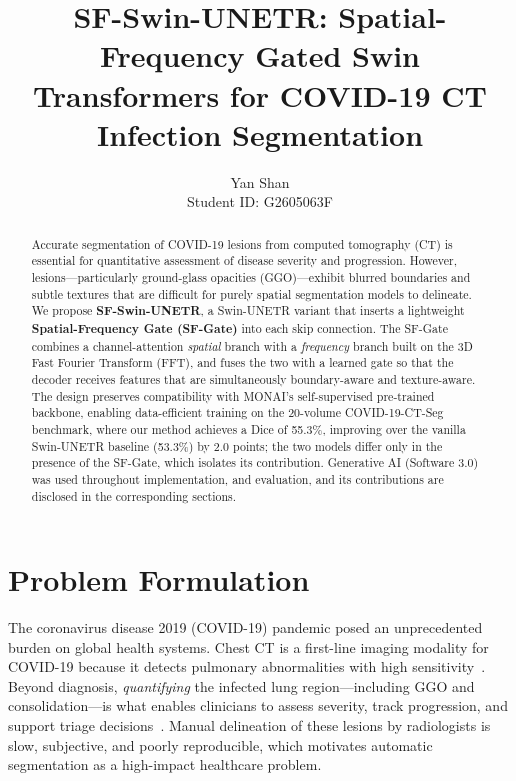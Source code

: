 \documentclass{article}
\title{SF-Swin-UNETR: Spatial-Frequency Gated Swin Transformers for COVID-19 CT Infection Segmentation}
\author{%
  Yan Shan \\
  Student ID: G2605063F\\
}
\begin{document}
\maketitle

\begin{abstract}
Accurate segmentation of COVID-19 lesions from computed tomography (CT) is essential for quantitative assessment of disease severity and progression. However, lesions---particularly ground-glass opacities (GGO)---exhibit blurred boundaries and subtle textures that are difficult for purely spatial segmentation models to delineate. We propose \textbf{SF-Swin-UNETR}, a Swin-UNETR variant that inserts a lightweight \textbf{Spatial-Frequency Gate (SF-Gate)} into each skip connection. The SF-Gate combines a channel-attention \emph{spatial} branch with a \emph{frequency} branch built on the 3D Fast Fourier Transform (FFT), and fuses the two with a learned gate so that the decoder receives features that are simultaneously boundary-aware and texture-aware. The design preserves compatibility with MONAI's self-supervised pre-trained backbone, enabling data-efficient training on the 20-volume COVID-19-CT-Seg benchmark, where our method achieves a Dice of 55.3\%, improving over the vanilla Swin-UNETR baseline (53.3\%) by 2.0 points; the two models differ only in the presence of the SF-Gate, which isolates its contribution. Generative AI (Software 3.0) was used throughout implementation, and evaluation, and its contributions are disclosed in the corresponding sections.
\end{abstract}

\section{Problem Formulation}
\label{sec:problem}

The coronavirus disease 2019 (COVID-19) pandemic posed an unprecedented burden on global health systems. Chest CT is a first-line imaging modality for COVID-19 because it detects pulmonary abnormalities with high sensitivity~\citep{ai2020covid19sensitivity}. Beyond diagnosis, \emph{quantifying} the infected lung region---including GGO and consolidation---is what enables clinicians to assess severity, track progression, and support triage decisions~\citep{bernheim2020covid19ct}. Manual delineation of these lesions by radiologists is slow, subjective, and poorly reproducible, which motivates automatic segmentation as a high-impact healthcare problem.
\end{document}

